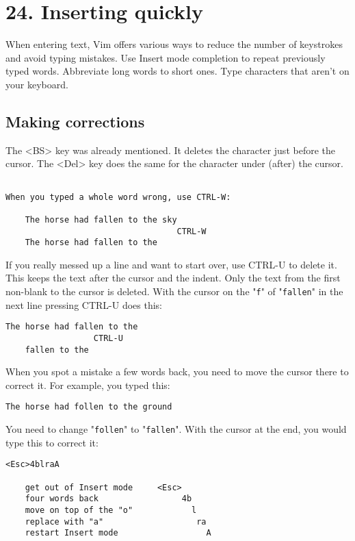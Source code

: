 \section{24. Inserting quickly}
When entering text, Vim offers various ways to reduce the number of keystrokes and avoid typing mistakes.
Use Insert mode completion to repeat previously typed words.
Abbreviate long words to short ones.
Type characters that aren't on your keyboard.
\subsection{Making corrections}
The <BS> key was already mentioned.
It deletes the character just before the cursor.
The <Del> key does the same for the character under (after) the cursor.

\begin{Verbatim}[samepage=true]

When you typed a whole word wrong, use CTRL-W:

    The horse had fallen to the sky 
                                   CTRL-W
    The horse had fallen to the 
\end{Verbatim}

If you really messed up a line and want to start over, use CTRL-U to delete it.
This keeps the text after the cursor and the indent.
Only the text from the first non-blank to the cursor is deleted.
With the cursor on the "\verb!f!" of "\verb!fallen!" in the next line pressing CTRL-U does this:

\begin{Verbatim}[samepage=true]
    The horse had fallen to the 
                  CTRL-U
    fallen to the 
\end{Verbatim}

When you spot a mistake a few words back, you need to move the cursor there to correct it.
For example, you typed this:

\begin{Verbatim}[samepage=true]
    The horse had follen to the ground 
\end{Verbatim}

You need to change "\verb!follen!" to "\verb!fallen!".
With the cursor at the end, you would type this to correct it:

\begin{Verbatim}[samepage=true]
                               <Esc>4blraA

    get out of Insert mode     <Esc>
    four words back                 4b
    move on top of the "o"            l
    replace with "a"                   ra
    restart Insert mode                  A
\end{Verbatim}

